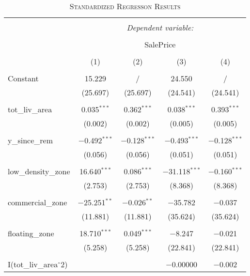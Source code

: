\documentclass[a4paper]{article}
\begin{document}
\begin{table}[!htbp] \centering 
\begin{adjustwidth}{-0.0cm}{-0cm}
\begin{threeparttable}
\small
\captionsetup{font=small, justification=raggedright,singlelinecheck=false}
\caption{\textsc{Standardized Regresson Results}}
\centering 
  \label{}
\small 
\begin{tabular}{@{\extracolsep{1pt}}lcccc} 
\\[-5.8ex]\hline 
\hline \\[-1.8ex] 
 & \multicolumn{4}{c}{\textit{Dependent variable:}} \\ 
\cline{2-5} 
\\[-1.8ex] & \multicolumn{4}{c}{SalePrice} \\ 
\\[-1.8ex] & (1) & (2) & (3) & (4)\\ 
\hline \\[-1.8ex] 
 Constant & 15.229 & / & 24.550 & / \\ 
  & (25.697) & (25.697) & (24.541) & (24.541) \\ 
  & & & & \\ 
 tot\_liv\_area & 0.035$^{***}$ & 0.362$^{***}$ & 0.038$^{***}$ & 0.393$^{***}$ \\ 
  & (0.002) & (0.002) & (0.005) & (0.005) \\ 
  & & & & \\ 
 y\_since\_rem & $-$0.492$^{***}$ & $-$0.128$^{***}$ & $-$0.493$^{***}$ & $-$0.128$^{***}$ \\ 
  & (0.056) & (0.056) & (0.051) & (0.051) \\ 
  & & & & \\ 
 low\_density\_zone & 16.640$^{***}$ & 0.086$^{***}$ & $-$31.118$^{***}$ & $-$0.160$^{***}$ \\ 
  & (2.753) & (2.753) & (8.368) & (8.368) \\ 
  & & & & \\ 
 commercial\_zone & $-$25.251$^{**}$ & $-$0.026$^{**}$ & $-$35.782 & $-$0.037 \\ 
  & (11.881) & (11.881) & (35.624) & (35.624) \\ 
  & & & & \\ 
 floating\_zone & 18.710$^{***}$ & 0.049$^{***}$ & $-$8.247 & $-$0.021 \\ 
  & (5.258) & (5.258) & (22.841) & (22.841) \\ 
  & & & & \\ 
 I(tot\_liv\_area$\hat{\mkern6mu}$2) &  &  & $-$0.00000 & $-$0.002 \\ 

\end{tabular}
\end{threeparttable}
\end{adjustwidth}
\end{table}
\end{document}
